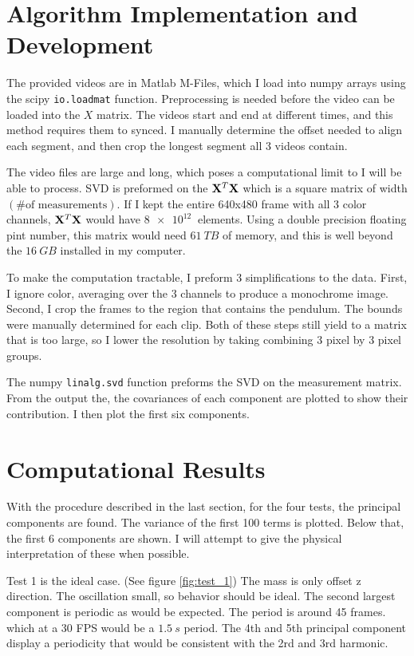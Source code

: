 \documentclass{article}
\begin{document}
    \section{Algorithm Implementation and Development}
    The provided videos are in Matlab M-Files, which I load into numpy arrays
    using the scipy \lstinline{io.loadmat} function. Preprocessing is needed
    before the video can be loaded into the $X$ matrix. The videos start and end
    at different times, and this method requires them to synced. I manually
    determine the offset needed to align each segment, and then crop the longest
    segment all 3 videos contain.

    The video files are large and long, which poses a computational limit to I
    will be able to process. SVD is preformed on the $\vb{X}^T \vb{X}$ which is
    a square matrix of width $(\textrm{\# of measurements})$. If I kept the
    entire 640x480 frame with all 3 color channels, $\vb{X}^T \vb{X}$ would have
    $\SI{8e12}{}$ elements. Using a double precision floating pint number,
    this matrix would need $\SI{61}{TB}$ of memory, and this is well beyond the
    $\SI{16}{GB}$ installed in my computer.

    To make the computation tractable, I preform 3 simplifications to the data.
    First, I ignore color, averaging over the 3 channels to produce a
    monochrome image. Second, I crop the frames to the region that contains
    the pendulum. The bounds were manually determined for each clip. Both of
    these steps still yield to a matrix that is too large, so I lower the
    resolution by taking combining 3 pixel by 3 pixel groups.

    The numpy \lstinline{linalg.svd} function preforms the SVD on the
    measurement matrix. From the output the, the covariances of each component
    are plotted to show their contribution. I then plot the first six
    components.
    
    \section{Computational Results}
    With the procedure described in the last section, for the four tests, the
    principal components are found. The variance of the first 100 terms is
    plotted. Below that, the first 6 components are shown. I will attempt to
    give the physical interpretation of these when possible.

    Test 1 is the ideal case. (See figure \ref{fig:test_1}) The mass is only
    offset z direction. The oscillation small, so behavior should be ideal. The
    second largest component is periodic as would be expected. The period is
    around 45 frames. which at a 30 FPS would be a $\SI{1.5}{s}$ period. The 4th
    and 5th principal component display a periodicity that would be consistent
    with the 2rd and 3rd harmonic.
\end{document}
